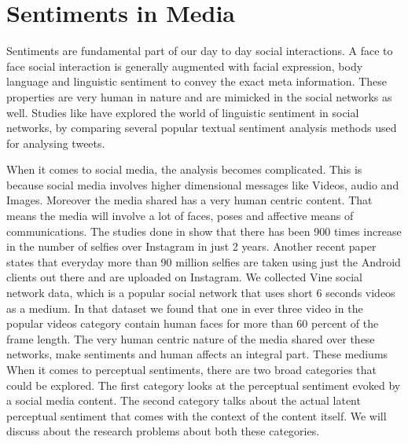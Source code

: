 \section{Sentiments in Media}
Sentiments are fundamental part of our day to day social interactions. A face to face social interaction is generally augmented with facial expression, body language and linguistic sentiment to convey the exact meta information. These properties are very human in nature and are mimicked in the social networks as well. Studies like \cite{Joo2014b} have explored the world of linguistic sentiment in social networks, by comparing several popular textual sentiment analysis methods used for analysing tweets. 
\par
When it comes to social media, the analysis becomes complicated. This is because social media involves higher dimensional messages like Videos, audio and Images. Moreover the media shared has a very human centric content. That means the media will involve a lot of faces, poses and affective means of communications. The studies done in \cite{Souza2015} show that there has been 900 times increase in the number of selfies over Instagram in just 2 years. Another recent paper \cite{goodSelfie} states that everyday more than 90 million selfies are taken using just the Android clients out there and are uploaded on Instagram. We collected Vine social network data, which is a popular social network that uses short 6 seconds videos as a medium. In that dataset we found that  one in ever three video in the popular videos category contain human faces for more than 60 percent of the frame length. 
The very human centric nature of the media shared over these networks, make sentiments and human affects an integral part. These mediums 
When it comes to perceptual sentiments, there are two broad categories that could be explored. The first category looks at the perceptual sentiment evoked by a social media content. The second category talks about the actual latent perceptual sentiment that comes with the context of the content itself. We will discuss about the research problems about both these categories.

